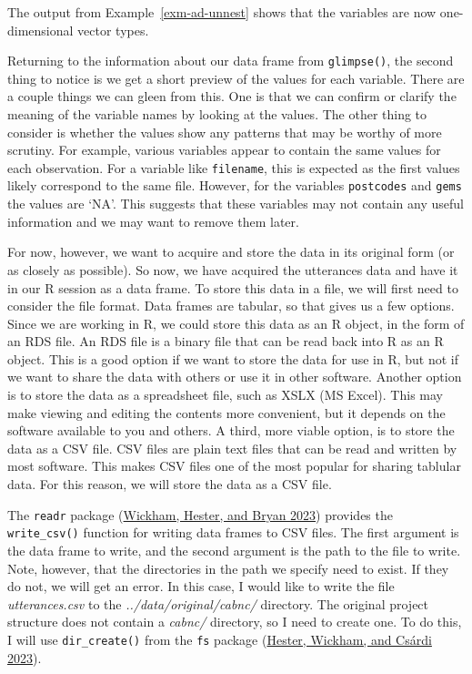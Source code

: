 \documentclass[
  letterpaper,
  DIV=11,
  numbers=noendperiod]{scrreport}
\theoremstyle{definition}
\theoremstyle{remark}
\begin{document}
The output from Example~\ref{exm-ad-unnest} shows that the variables are
now one-dimensional vector types.

Returning to the information about our data frame from
\texttt{glimpse()}, the second thing to notice is we get a short preview
of the values for each variable. There are a couple things we can gleen
from this. One is that we can confirm or clarify the meaning of the
variable names by looking at the values. The other thing to consider is
whether the values show any patterns that may be worthy of more
scrutiny. For example, various variables appear to contain the same
values for each observation. For a variable like \texttt{filename}, this
is expected as the first values likely correspond to the same file.
However, for the variables \texttt{postcodes} and \texttt{gems} the
values are `NA'. This suggests that these variables may not contain any
useful information and we may want to remove them later.

For now, however, we want to acquire and store the data in its original
form (or as closely as possible). So now, we have acquired the
utterances data and have it in our R session as a data frame. To store
this data in a file, we will first need to consider the file format.
Data frames are tabular, so that gives us a few options. Since we are
working in R, we could store this data as an R object, in the form of an
RDS file. An RDS file is a binary file that can be read back into R as
an R object. This is a good option if we want to store the data for use
in R, but not if we want to share the data with others or use it in
other software. Another option is to store the data as a spreadsheet
file, such as XSLX (MS Excel). This may make viewing and editing the
contents more convenient, but it depends on the software available to
you and others. A third, more viable option, is to store the data as a
CSV file. CSV files are plain text files that can be read and written by
most software. This makes CSV files one of the most popular for sharing
tablular data. For this reason, we will store the data as a CSV file.

The \texttt{readr} package (\protect\hyperlink{ref-R-readr}{Wickham,
Hester, and Bryan 2023}) provides the \texttt{write\_csv()} function for
writing data frames to CSV files. The first argument is the data frame
to write, and the second argument is the path to the file to write.
Note, however, that the directories in the path we specify need to
exist. If they do not, we will get an error. In this case, I would like
to write the file \emph{utterances.csv} to the
\emph{../data/original/cabnc/} directory. The original project structure
does not contain a \emph{cabnc/} directory, so I need to create one. To
do this, I will use \texttt{dir\_create()} from the \texttt{fs} package
(\protect\hyperlink{ref-R-fs}{Hester, Wickham, and Csárdi 2023}).
\end{document}
